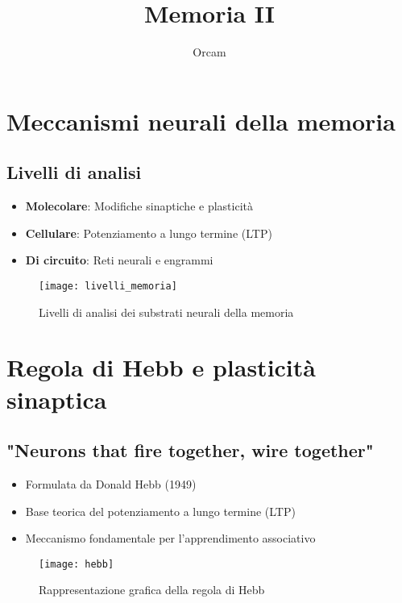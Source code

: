 \documentclass[11pt]{article}
\title{Memoria II}
\author{Orcam}
\date{}
\begin{document}
\maketitle

\section*{Meccanismi neurali della memoria}

\subsection*{Livelli di analisi}
\begin{itemize}
    \item \textbf{Molecolare}: Modifiche sinaptiche e plasticità
    \item \textbf{Cellulare}: Potenziamento a lungo termine (LTP)
    \item \textbf{Di circuito}: Reti neurali e engrammi
\end{itemize}

\begin{figure}[h]
    \centering
    \texttt{[image: livelli\_memoria]} %
    \caption{Livelli di analisi dei substrati neurali della memoria}
    \label{fig:livelli}
\end{figure}

\section*{Regola di Hebb e plasticità sinaptica}

\subsection*{"Neurons that fire together, wire together"}
\begin{itemize}
    \item Formulata da Donald Hebb (1949)
    \item Base teorica del potenziamento a lungo termine (LTP)
    \item Meccanismo fondamentale per l'apprendimento associativo
\end{itemize}

\begin{figure}[h]
    \centering
    \texttt{[image: hebb]} %
    \caption{Rappresentazione grafica della regola di Hebb}
    \label{fig:hebb}
\end{figure}
\end{document}
